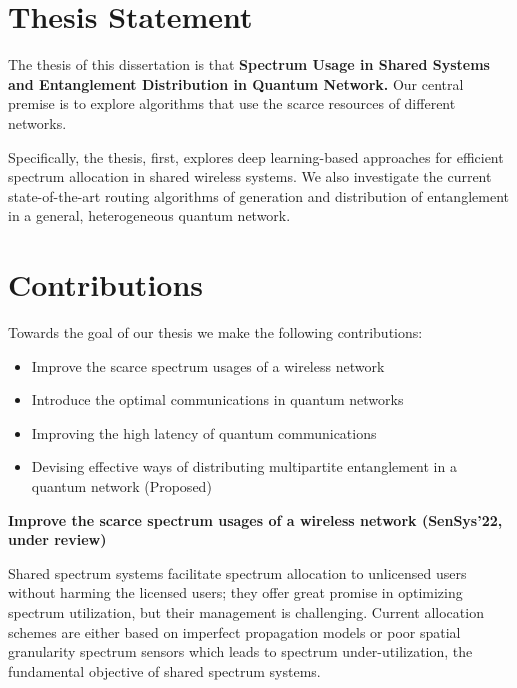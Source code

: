 
\section{Thesis Statement}

The thesis of this dissertation is that \textbf{Spectrum Usage in Shared Systems and Entanglement Distribution in Quantum Network.} 
Our central premise is to explore algorithms that use the scarce resources of different networks.

Specifically, the thesis, first, explores deep learning-based approaches for efficient spectrum allocation in shared wireless systems.
We also investigate the current state-of-the-art routing algorithms of generation and distribution of entanglement in a general, heterogeneous quantum network.

\section{Contributions}

Towards the goal of our thesis we make the following contributions:

\begin{itemize}
    \item Improve the scarce spectrum usages of a wireless network
    \item Introduce the optimal communications in quantum networks
    \item Improving the high latency of quantum communications
    \item Devising effective ways of distributing multipartite entanglement in a quantum network (Proposed)
\end{itemize}

\vspace{6pt}\noindent \textbf{Improve the scarce spectrum usages of a wireless network (SenSys'22, under review)}

Shared spectrum systems facilitate spectrum allocation to unlicensed users without harming the licensed users; they offer great promise in optimizing spectrum utilization, but their management is challenging.
Current allocation schemes are either based on imperfect propagation models or poor spatial granularity spectrum sensors which leads to spectrum under-utilization,  the fundamental objective of shared
spectrum systems.

